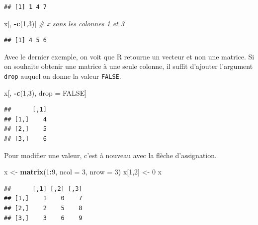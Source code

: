\documentclass[
  11pt,
]{book}
\newenvironment{Shaded}{\begin{snugshade}}{\end{snugshade}}
\newcommand{\CommentTok}[1]{\textcolor[rgb]{0.56,0.35,0.01}{\textit{#1}}}
\newcommand{\DataTypeTok}[1]{\textcolor[rgb]{0.13,0.29,0.53}{#1}}
\newcommand{\DecValTok}[1]{\textcolor[rgb]{0.00,0.00,0.81}{#1}}
\newcommand{\KeywordTok}[1]{\textcolor[rgb]{0.13,0.29,0.53}{\textbf{#1}}}
\newcommand{\NormalTok}[1]{#1}
\newcommand{\OperatorTok}[1]{\textcolor[rgb]{0.81,0.36,0.00}{\textbf{#1}}}
\newcommand{\OtherTok}[1]{\textcolor[rgb]{0.56,0.35,0.01}{#1}}
\newcommand{\StringTok}[1]{\textcolor[rgb]{0.31,0.60,0.02}{#1}}
\numberwithin{equation}{section}
\numberwithin{countremarque}{section}
\begin{document}
\begin{lstlisting}
## [1] 1 4 7
\end{lstlisting}

\begin{Shaded}
\begin{Highlighting}[]
\NormalTok{x[, }\OperatorTok{{-}}\KeywordTok{c}\NormalTok{(}\DecValTok{1}\NormalTok{,}\DecValTok{3}\NormalTok{)]    }\CommentTok{\# x sans les colonnes 1 et 3}
\end{Highlighting}
\end{Shaded}

\begin{lstlisting}
## [1] 4 5 6
\end{lstlisting}

Avec le dernier exemple, on voit que R retourne un vecteur et non une matrice. Si on souhaite obtenir une matrice à une seule colonne, il suffit d'ajouter l'argument \texttt{drop} auquel on donne la valeur \texttt{FALSE}.

\begin{Shaded}
\begin{Highlighting}[]
\NormalTok{x[, }\OperatorTok{{-}}\KeywordTok{c}\NormalTok{(}\DecValTok{1}\NormalTok{,}\DecValTok{3}\NormalTok{), drop =}\StringTok{ }\OtherTok{FALSE}\NormalTok{]}
\end{Highlighting}
\end{Shaded}

\begin{lstlisting}
##      [,1]
## [1,]    4
## [2,]    5
## [3,]    6
\end{lstlisting}

Pour modifier une valeur, c'est à nouveau avec la flèche d'assignation.

\begin{Shaded}
\begin{Highlighting}[]
\NormalTok{x \textless{}{-}}\StringTok{ }\KeywordTok{matrix}\NormalTok{(}\DecValTok{1}\OperatorTok{:}\DecValTok{9}\NormalTok{, }\DataTypeTok{ncol =} \DecValTok{3}\NormalTok{, }\DataTypeTok{nrow =} \DecValTok{3}\NormalTok{)}
\NormalTok{x[}\DecValTok{1}\NormalTok{,}\DecValTok{2}\NormalTok{] \textless{}{-}}\StringTok{ }\DecValTok{0}
\NormalTok{x}
\end{Highlighting}
\end{Shaded}

\begin{lstlisting}
##      [,1] [,2] [,3]
## [1,]    1    0    7
## [2,]    2    5    8
## [3,]    3    6    9
\end{lstlisting}
\end{document}
